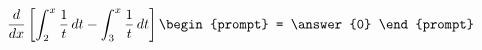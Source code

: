 \documentclass{ximera}
\author{Steven Gubkin}
\begin{document}
\begin{exercise}

\[
\frac{\d}{\d x} \left[ \int_2^{x} \frac{1}{t} \d t - \int_3^x \frac{1}{t} \d t  \right] \begin{prompt} = \answer{0} \end{prompt}
\]

\end{exercise}
\end{document}
